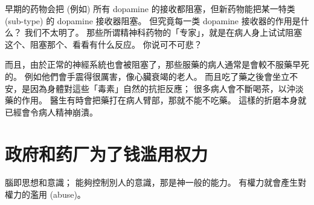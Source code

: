 \documentclass[12pt]{report}
\newcommand{\cc}[2]{#1}
\newcommand{\cc}[2]{#2}
\begin{document}
{\cc{
早期的药物会把 (例如) 所有 dopamine 的接收都阻塞，但新药物能把某一特类 (sub-type) 的 dopamine 接收器阻塞。 但究竟每一类 dopamine 接收器的作用是什么？ 我们不太明了。 那些所谓精神科药物的「专家」，就是在病人身上试试阻塞这个、阻塞那个、看看有什么反应。 你说可不可悲？
}{
Early anti-psychotic drugs block (for example, all dopamine) receptors \textbf{indiscriminately}, but newer drugs \textbf{selectively} block certain \textit{sub-types} of receptors.  But what is the \textit{specific function} of each sub-type of, say dopamine, receptors in the brain?  We simply don't know yet.  The so-called ``experts'' in psychiatry, all they can do now is to try to block this and that receptor, \textit{and see what happens to test subjects}.  Don't you think that is rather \textit{pathetic}?
}

\cc{
而且，由於正常的神經系統也會被阻塞了，那些服藥的病人通常是會較不服藥早死的。 例如他們會手震得很厲害，像心臟衰竭的老人。 而且吃了藥之後會坐立不安，是因為身體對這些「毒素」自然的抗拒反應； 很多病人會不斷喝茶，以沖淡藥的作用。 醫生有時會把藥打在病人臂部，那就不能不吃藥。 這樣的折磨本身就已經會令病人精神崩潰。
}{
Also, because the normal-functioning nervous system is blocked, patients taking these drugs often \textit{die earlier} than those who don't take them.  Often their hands shake violently, as though they are old people with very bad heart conditions.  And they feel extremely uncomfortable after taking the drugs, as their brain naturally recognizes the foreign substance in the bloodstream, and their body feels repulsed by these ``toxins'';  the patients, who are forced to take such drugs, often drink a lot of tea or coffee to try to ``wash away'' the drugs' effects.  Doctors sometimes order to inject the drugs into the patient's buttocks, so that they could not refuse to take them orally.  The trauma resulting from such torture is itself sufficient to break a patient's will and cause a mental breakdown.
}

\section{\cc{政府和药厂为了钱滥用权力}{Government and pharmaceutical companies abuse their power}}

\cc{
腦即思想和意識； 能夠控制別人的意識，那是神一般的能力。 有權力就會產生對權力的濫用 (abuse)。
}{
The brain is the site of our thoughts and consciousness;  To be able to control other people consciousness amounts to a god-like power.  And power tends to corrupt those in authority, causing them to abuse their power.
}

}
\end{document}
